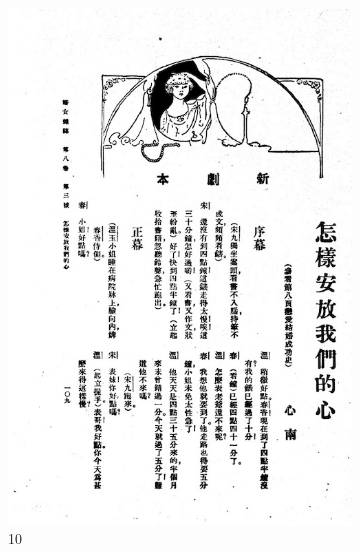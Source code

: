\documentclass[12pt,twoside]{report}
\begin{document}
\begin{appendices}
\begin{figure}[htbp]
\begin{subfigure}[b]{0.23\linewidth}
        \includegraphics[width=\linewidth]{./figures/testset/10.jpg}
        \caption{10}
        \label{fig:test_10}
    \end{subfigure}
    \hfill
    \begin{subfigure}[b]{0.23\linewidth}

\end{subfigure}
\end{figure}
\end{appendices}
\end{document}
